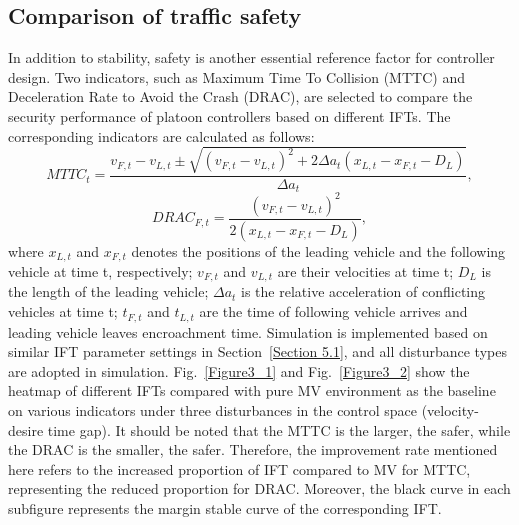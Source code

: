\documentclass[journal]{IEEEtran}
\begin{document}
\subsection{Comparison of traffic safety}
\label{Section 5.4}

In addition to stability, safety is another essential reference factor for controller design. Two indicators, such as Maximum Time To Collision (MTTC) and Deceleration Rate to Avoid the Crash (DRAC), are selected to compare the security performance of platoon controllers based on different IFTs. The corresponding indicators are calculated as follows:
\begin{equation}
  MTTC_{t}=\frac{v_{F, t}-v_{L, t} \pm \sqrt{\left(v_{F, t}-v_{L, t}\right)^{2}+2 \Delta a_{t}\left(x_{L, t}-x_{F, t}-D_{L}\right)}}{\Delta a_{t}},
\end{equation}
\begin{equation}
  DRAC_{F, t}=\frac{\left(v_{F, t}-v_{L, t}\right)^{2}}{2\left(x_{L, t}-x_{F, t}-D_{L}\right)},
\end{equation}
where $x_{L,t}$ and $x_{F,t}$ denotes the positions of the leading vehicle and the following vehicle at time t, respectively; $v_{F,t}$ and $v_{L,t}$ are their velocities at time t; $D_L$ is the length of the leading vehicle; $\Delta a_t$ is the relative acceleration of conflicting vehicles at time t; $t_{F,t}$ and $t_{L,t}$ are the time of following vehicle arrives and leading vehicle leaves encroachment time. Simulation is implemented based on similar IFT parameter settings in Section~\ref{Section 5.1}, and all disturbance types are adopted in simulation. Fig.~\ref{Figure3_1} and Fig.~\ref{Figure3_2} show the heatmap of different IFTs compared with pure MV environment as the baseline on various indicators under three disturbances in the control space (velocity-desire time gap). It should be noted that the MTTC is the larger, the safer, while the DRAC is the smaller, the safer. Therefore, the improvement rate mentioned here refers to the increased proportion of IFT compared to MV for MTTC, representing the reduced proportion for DRAC. Moreover, the black curve in each subfigure represents the margin stable curve of the corresponding IFT.
\end{document}
